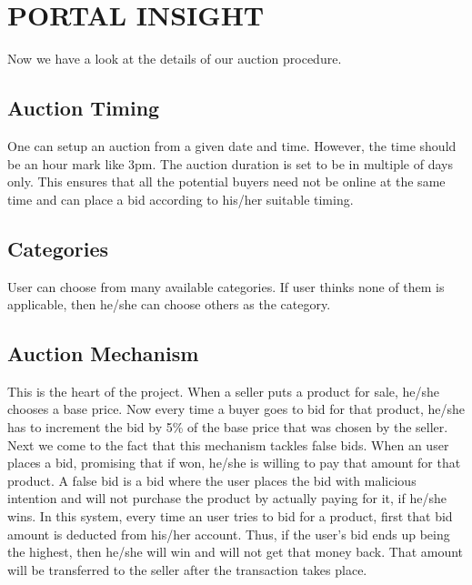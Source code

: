 \documentclass[12pt]{article}
\begin{document}
\section{PORTAL INSIGHT}
Now we have a look at the details of our auction procedure.

\subsection{Auction Timing}
One can setup an auction from a given date and time. However, the time should be an hour mark like 3pm. The auction duration is set to be in multiple of days only. This ensures that all the potential buyers need not be online at the same time and can place a bid according to his/her suitable timing.

\subsection{Categories}
User can choose from many available categories. If user thinks none of them is applicable, then he/she can choose others as the category.

\subsection{Auction Mechanism}
This is the heart of the project. When a seller puts a product for sale, he/she chooses a base price. Now every time a buyer goes to bid for that product, he/she has to increment the bid by 5\% of the base price that was chosen by the seller.\\
Next we come to the fact that this mechanism tackles false bids. When an user places a bid, promising that if won, he/she is willing to pay that amount for that product. A false bid is a bid where the user places the bid with malicious intention and will not purchase the product by actually paying for it, if he/she wins. In this system, every time an user tries to bid for a product, first that bid amount is deducted from his/her account. Thus, if the user's bid ends up being the highest, then he/she will win and will not get that money back. That amount will be transferred to the seller after the transaction takes place.\\
\end{document}
